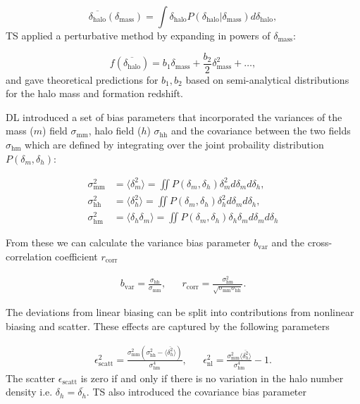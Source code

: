 \begin{equation}
\overline{\delta_{\mathrm{halo}}}(\delta_{\mathrm{mass}}) = \int \delta_{\mathrm{halo}} P(\delta_{\mathrm{halo}} | \delta_{\mathrm{mass}} ) d \delta_{\mathrm{halo}},
\end{equation}
TS applied a perturbative method by expanding in powers of $\delta_{\mathrm{mass}}$:

\begin{equation}
\label{eq:bias_perturb}
f(\overline{\delta_{\mathrm{halo}}}) = b_1 \delta_{\mathrm{mass}} + \frac{b_2}{2} \delta_{\mathrm{mass}}^2 + \ldots,
\end{equation}
and gave theoretical predictions for $b_1, b_2$ based on semi-analytical distributions for the halo mass and formation redshift.

DL introduced a set of bias parameters that incorporated the variances of the mass ($m$) field $\sigma_{\mathrm{mm}}$, halo field ($h$) $\sigma_{\mathrm{hh}}$ and the covariance between the two fields $\sigma_{\mathrm{hm}}$ which are defined by integrating over the joint probaility distribution $P(\delta_m,\delta_h)$: 

\begin{align}
\sigma_{\mathrm{mm}}^2 &= \langle \delta_m^2 \rangle = \iint P(\delta_m,\delta_h) \delta_m^2   d\delta_m d\delta_h, \\
\sigma_{\mathrm{hh}}^2 &= \langle \delta_h^2 \rangle = \iint P(\delta_m,\delta_h) \delta_h^2  d\delta_m d\delta_h, \\
\sigma_{\mathrm{hm}}^2 &= \langle \delta_h \delta_m \rangle = \iint P(\delta_m,\delta_h) \delta_h \delta_m d\delta_m d\delta_h
\end{align}

From these we can calculate the variance bias parameter $b_{\mathrm{var}}$ and the cross-correlation coefficient $r_{\mathrm{corr}}$

\begin{align}
b_{\mathrm{var}} = \frac{\sigma_{\mathrm{hh}}}{\sigma_{\mathrm{mm}}}, &&
r_{\mathrm{corr}} = \frac{\sigma_{\mathrm{hm}}^2}{\sqrt{\sigma_{\mathrm{mm}} \sigma_{\mathrm{hh}} }}.
\end{align}

The deviations from linear biasing can be split into contributions from nonlinear biasing and scatter. These effects are captured by the following parameters

\begin{align}
\epsilon_{\mathrm{scatt}}^2 = \frac{\sigma_{\mathrm{mm}}^2 (\sigma_{\mathrm{hh}}^2 - \langle \overline{\delta_h^2} \rangle)}{\sigma_{\mathrm{hm}}^4}, &&
\epsilon_{\mathrm{nl}}^2 = \frac{\sigma_{\mathrm{mm}}^2 \langle \overline{\delta_h^2} \rangle}{\sigma_{\mathrm{hm}}^4} -1.
\end{align}
The scatter $\epsilon_{\mathrm{scatt}}$ is zero if and only if there is no variation in the halo number density i.e. $\delta_h = \overline{\delta_h}$. TS also introduced the covariance bias parameter

